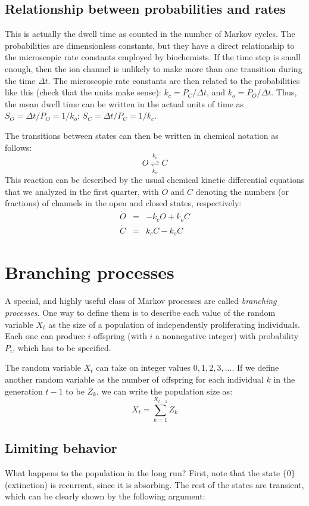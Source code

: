 \documentclass[11pt]{book}
\begin{document}
\subsection{Relationship between probabilities and rates}
This is actually the dwell time as counted in the number of Markov cycles. The probabilities are dimensionless constants, but they have a direct relationship to the microscopic rate constants employed by biochemists. If the time step is small enough, then the ion channel is unlikely to make more than one transition during the time $\Delta t$. The microscopic rate constants are then related to the probabilities like this (check that the units make sense): $k_c = P_C / \Delta t$, and $k_o = P_O /\Delta t$. Thus, the mean dwell time can be written in the actual units of time as $S_O = \Delta t /P_O = 1/k_o$; $S_C = \Delta t /P_C = 1/k_c$.

The transitions between states can then be written in chemical notation as follows:
$$ O  {\textstyle \overset{k_c}{\underset{k_{o}}{\rightleftharpoons}}}  C$$ 
This reaction can be described by the usual chemical kinetic differential equations that we analyzed in the first quarter, with $O$ and $C$ denoting the numbers (or fractions) of channels in the open and closed states, respectively:
\begin{eqnarray*}
\dot O & = & -k_c O + k_o C \\
\dot C & = & k_c C - k_o C 
\end{eqnarray*}

\section{Branching processes}
A special, and highly useful class of Markov processes are called \emph{branching processes}. One way to define them is to describe each value of the random variable $X_t$ as the size of a population of independently proliferating individuals. Each one can produce $i$ offspring (with $i$ a nonnegative integer) with probability $P_i$, which has to be specified.

The random variable $X_t$ can take on integer values $0, 1, 2, 3, ...$. If we define another random variable as the number of offspring for each individual $k$ in the generation $t-1$ to be $Z_k$, we can write the population size as:
$$ X_{t} = \sum_{k=1}^{X_{t-1}} Z_k$$

\subsection{Limiting behavior}
What happens to the population in the long run? First, note that the state $\{0\}$ (extinction) is recurrent, since it is absorbing. The rest of the states are transient, which can be clearly shown by the following argument:
\end{document}
